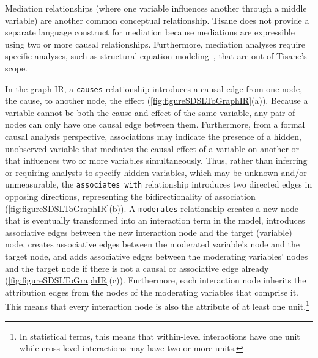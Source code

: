\enlargethispage{-12pt}


Mediation relationships (where one variable influences another through a middle variable) are another common conceptual relationship. Tisane does
not provide a separate language construct for %
mediation because mediations are expressible using two or more causal
relationships. Furthermore, mediation analyses require specific analyses, such
as structural equation modeling~\cite{hoyle1995SEM}, that are out of Tisane's
scope.

In the graph IR, a \texttt{causes} relationship introduces a causal edge from
one node, the cause, to another node, the effect (\autoref{fig:figureSDSLToGraphIR}(a)). Because a
variable cannot be both the cause and effect of the same variable, any pair of
nodes can only have one causal edge between them. Furthermore, from a formal
causal analysis perspective, associations may indicate the presence of a hidden,
unobserved variable that mediates the causal effect of a variable on another or
that influences two or more variables simultaneously. Thus, rather than
inferring or requiring analysts to specify hidden variables, which may be
unknown and/or unmeasurable, the \texttt{associates\_with} relationship introduces two directed edges in
opposing directions, representing the bidirectionality of association (\autoref{fig:figureSDSLToGraphIR}(b)). A \texttt{moderates}
relationship creates a new node that is eventually transformed into an interaction term in the model, introduces associative edges between the new
interaction node and the target (variable) node, creates associative edges between the moderated variable's node and the target node, and adds associative
edges between the moderating variables' nodes and the
target node if there is not a causal or associative edge already (\autoref{fig:figureSDSLToGraphIR}(c)).
Furthermore, each interaction node inherits the attribution edges from the nodes of the
\nobreak moderating variables that comprise it. This means that every interaction node is
also the attribute of
at least one unit.\footnote{In statistical terms, this
means that within-level interactions have one unit while cross-level
interactions may have two or more units.}

\figureSDSLToGraphIR


